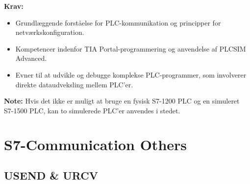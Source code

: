 \textbf{Krav:}
\begin{itemize}
	\item Grundlæggende forståelse for PLC-kommunikation og principper for netværkskonfiguration.
	\item Kompetencer indenfor TIA Portal-programmering og anvendelse af PLCSIM Advanced.
	\item Evner til at udvikle og debugge komplekse PLC-programmer, som involverer direkte dataudveksling mellem PLC'er.
\end{itemize}
\textbf{Note:} Hvis det ikke er muligt at bruge en fysisk S7-1200 PLC og en simuleret S7-1500 PLC, kan to simulerede PLC'er anvendes i stedet.

\section{S7-Communication Others}
\subsection*{USEND \& URCV}
\label{subsec:usend_urcv_plc_communication}

